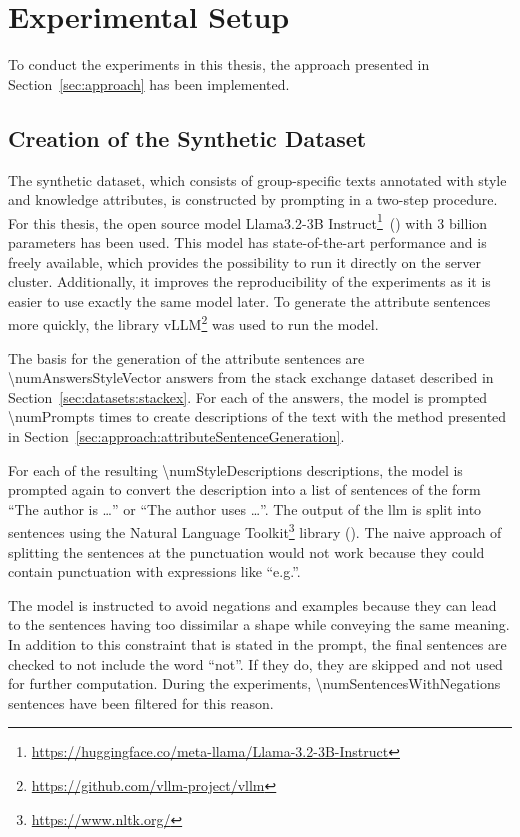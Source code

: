 \section{Experimental Setup}
\label{sec:experiments:setup}

To conduct the experiments in this thesis, the approach presented in Section~\ref{sec:approach} has been implemented.

\subsection{Creation of the Synthetic Dataset}
\label{sec:experiments:setup:sentenceGeneration}
The synthetic dataset, which consists of group-specific texts annotated with style and knowledge attributes, is constructed by prompting  in a two-step procedure. For this thesis, the open source model Llama3.2-3B Instruct\footnote{\url{https://huggingface.co/meta-llama/Llama-3.2-3B-Instruct}}~(\cite{dubeyLlama3Herd2024}) with \num{3} billion parameters has been used. This model has state-of-the-art performance and is freely available, which provides the possibility to run it directly on the server cluster. Additionally, it improves the reproducibility of the experiments as it is easier to use exactly the same model later.
To generate the attribute sentences more quickly, the library vLLM\footnote{\url{https://github.com/vllm-project/vllm}} was used to run the model.

The basis for the generation of the attribute sentences are \num{\numAnswersStyleVector} answers from the stack exchange dataset described in Section~\ref{sec:datasets:stackex}.
For each of the answers, the model is prompted \num{\numPrompts} times to create descriptions of the text with the method presented in Section~\ref{sec:approach:attributeSentenceGeneration}.

For each of the resulting \num{\numStyleDescriptions} descriptions, the model is prompted again to convert the description into a list of sentences of the form \enquote{The author is \ldots} or \enquote{The author uses \ldots}. The output of the \ac{llm} is split into sentences using the Natural Language Toolkit\footnote{\url{https://www.nltk.org/}} library (\cite{birdNaturalLanguageProcessing2009}). The naive approach of splitting the sentences at the punctuation would not work because they could contain punctuation with expressions like \enquote{e.g.}.

The model is instructed to avoid negations and examples because they can lead to the sentences having too dissimilar a shape while conveying the same meaning. In addition to this constraint that is stated in the prompt, the final sentences are checked to not include the word \enquote{not}. If they do, they are skipped and not used for further computation. During the experiments, \num{\numSentencesWithNegations} sentences have been filtered for this reason.

